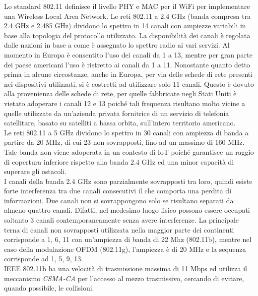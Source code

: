 \noindent Lo standard 802.11 definisce il livello PHY e MAC per il WiFi per implementare una Wireless Local Area Network. 
Le reti 802.11 a 2.4 GHz (banda compresa tra 2.4 GHz e 2.485 GHz) dividono lo spettro in 14 canali con ampiezze variabili in base alla topologia del protocollo utilizzato. La disponibilità dei canali è regolata dalle nazioni in base a come è assegnato lo spettro radio ai vari servizi. Al momento in Europa è consentito l'uso dei canali da 1 a 13, mentre per gran parte dei paese americani l'uso è ristretto ai canali da 1 a 11. 
Nonostante quanto detto prima in alcune circostanze, anche in Europa, per via delle schede di rete presenti nei dispositivi utilizzati, si è costretti ad utilizzare solo 11 canali. Questo è dovuto alla provenienza delle schede di rete, per quelle fabbricate negli Stati Uniti è vietato adoperare i canali 12 e 13 poiché tali frequenza risultano molto vicine a quelle utilizzate da un'azienda privata fornitrice di un servizio di telefonia satellitare, basato su satelliti a bassa orbita, sull'intero territorio americano.\\
Le reti 802.11 a 5 GHz dividono lo spettro in 30 canali con ampiezza di banda a partire da 20 MHz, di cui 23 non sovrapposti, fino ad un massimo di 160 MHz. Tale banda non viene adoperata in un contesto di IoT poiché garantisce un raggio di copertura inferiore rispetto alla banda 2.4 GHz ed una minor capacità di superare gli ostacoli.\\
I canali della banda 2.4 GHz sono parzialmente sovrapposti tra loro, quindi esiste forte interferenza tra due canali consecutivi il che comporta una perdita di informazioni. Due canali non si sovrappongono solo se risultano separati da almeno quattro canali. Difatti, nel medesimo luogo fisico possono essere occupati soltanto 3 canali contemporaneamente senza avere interferenze. La principale terna di canali non sovrapposti utilizzata nella maggior parte dei continenti corrisponde a 1, 6, 11 con un'ampiezza di banda di 22 Mhz (802.11b), mentre nel caso della modulazione OFDM (802.11g), l'ampiezza è di 20 MHz e la sequenza corrisponde ad 1, 5, 9, 13.\\
IEEE 802.11b ha una velocità di trasmissione massima di 11 Mbps ed utilizza il meccanismo \textit{CSMA-CA} per l'accesso al mezzo trasmissivo, cercando di evitare, quando possibile, le collisioni. 
